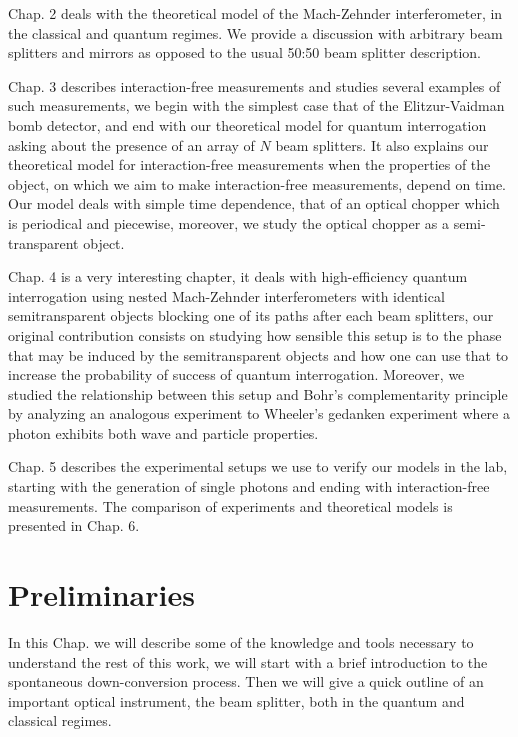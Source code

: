 \documentclass[12pt]{book}
\begin{document}
Chap. 2 deals with the theoretical model of the Mach-Zehnder interferometer, in the classical and quantum regimes. We provide a discussion with arbitrary beam splitters and mirrors as opposed to the usual 50:50 beam splitter description.

Chap. 3 describes interaction-free measurements and studies several examples of such measurements, we begin with the simplest case that of the Elitzur-Vaidman bomb detector, and end with our theoretical model for quantum interrogation asking about the presence of an array of $N$ beam splitters. It also explains our theoretical model for interaction-free measurements when the properties of the object, on which we aim to make interaction-free measurements, depend on time. Our model deals with simple time dependence, that of an optical chopper which is periodical and piecewise, moreover, we study the optical chopper as a semi-transparent object.

Chap. 4 is a very interesting chapter, it deals with high-efficiency quantum interrogation using nested Mach-Zehnder interferometers with identical semitransparent objects blocking one of its paths after each beam splitters, our original contribution consists on studying how sensible this setup is to the phase that may be induced by the semitransparent objects and how one can use that to increase the probability of success of quantum interrogation. Moreover, we studied the relationship between this setup and Bohr's complementarity principle by analyzing an analogous experiment to Wheeler's gedanken experiment where a photon exhibits both wave and particle properties.

Chap. 5 describes the experimental setups we use to verify our models in the lab, starting with the generation of single photons and ending with interaction-free measurements. The comparison of experiments and theoretical models is presented in Chap. 6.
 
  
\pagebreak



\chapter{Preliminaries}

In this Chap. we will describe some of the knowledge and tools necessary to understand the rest of this work, we will start with a brief introduction to the spontaneous down-conversion process. Then we will give a quick outline of an important optical instrument, the beam splitter, both in the quantum and classical regimes.
\end{document}
